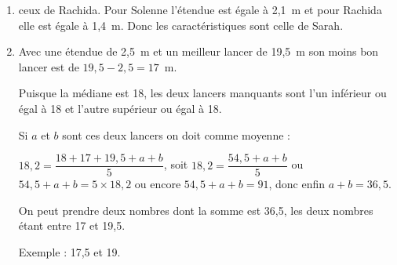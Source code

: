 
\medskip

%
%
%
%

\begin{enumerate}
\item %
ceux de Rachida.
Pour Solenne l'étendue est égale à 2,1~m et pour Rachida elle est égale à 1,4~m. Donc les caractéristiques sont celle de Sarah.
\item %

Avec une étendue de 2,5~m et un meilleur lancer de 19,5~m son moins bon lancer est de $19,5 - 2,5 = 17$~m.

Puisque la médiane est 18, les deux lancers manquants sont l'un inférieur ou égal à 18 et l'autre supérieur ou égal à 18.

Si $a$ et $b$ sont ces deux lancers on doit comme moyenne :

$18,2 = \dfrac{18 + 17 + 19,5 + a + b}{5}$, soit $18,2 = \dfrac{54,5 + a + b}{5}$ ou $54,5 + a + b = 5 \times 18,2$ ou encore $54,5 + a + b = 91$, donc enfin $a + b = 36,5$.

On peut prendre deux nombres dont la somme est 36,5, les deux nombres étant entre 17 et 19,5.

Exemple : 17,5 et 19.
\end{enumerate}

\vspace{0,5cm}

